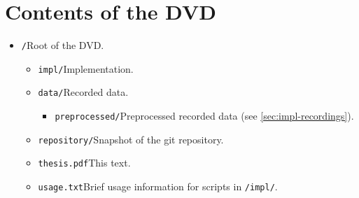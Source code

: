 \chapter{Contents of the DVD}

\begin{itemize}[label={},leftmargin=0pt]
    \item \verb=/=\dotfill{}Root of the DVD.
    \begin{itemize}[label={},leftmargin=1.5em]
        \item \verb=impl/=\dotfill{}Implementation.
        \item \verb=data/=\dotfill{}Recorded data.
        \begin{itemize}[label={},leftmargin=1.5em]
            \item \verb=preprocessed/=\dotfill{}Preprocessed recorded data (see \cref{sec:impl-recordings}).
        \end{itemize}
        \item \verb=repository/=\dotfill{}Snapshot of the git repository.
        \item \verb=thesis.pdf=\dotfill{}This text.
        \item \verb=usage.txt=\dotfill{}Brief usage information for scripts in \verb=/impl/=.
    \end{itemize}
\end{itemize}

